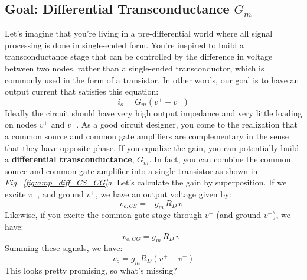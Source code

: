 \subsection{Goal:  Differential Transconductance \texorpdfstring{$G_m$}{}}
Let's imagine that you're living in a pre-differential world where all signal processing is done in single-ended form.  You're inspired to build a transconductance stage that can be controlled by the difference in voltage between two nodes, rather than a single-ended transconductor, which is commonly used in the form of a transistor.  In other words, our goal is to have an output current that satisfies this equation:
    \begin{equation}
        i_o = G_m (v^+ - v^-)
    \end{equation}
Ideally the circuit should have very high output impedance and very little loading on nodes $v^+$ and $v^-$.  As a good circuit designer, you come to the realization that a common source and common gate amplifiers are complementary in the sense that they have opposite phase.  If you equalize the gain, you can potentially build a \textbf{differential transconductance}, $G_m$.  In fact, you can combine the common source and common gate amplifier into a single transistor as shown in \emph{Fig.~\ref{fig:amp_diff_CS_CG}a}.  Let's calculate the gain by superposition.  If we excite $v^-$, and ground $v^+$, we have an output voltage given by:
    \begin{equation}
        v_{o,CS} = -g_m\,R_D\,v^-
    \end{equation} 
Likewise, if you excite the common gate stage through $v^+$ (and ground $v^-$), we have:
    \begin{equation}
        v_{o,CG} = g_m\,R_D\,v^+
    \end{equation} 
Summing these signals, we have:
    \begin{equation}
        v_o = g_m R_D(v^+ - v^-)
    \end{equation}
This looks pretty promising, so what's missing? 
\newpage
